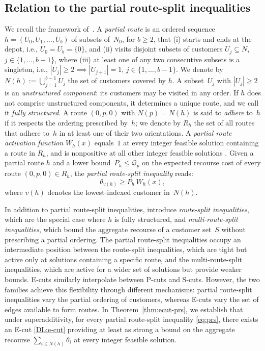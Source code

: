 \documentclass{article}
\newcommand{\rev}[1]{{\color{black}#1}}
\begin{document}
\rev{
\subsection{Relation to the partial route-split inequalities} \label{sec:ecut-prs}

We recall the framework of~\cite{hoogendoorn2023improved}. A \emph{partial route} \cite[Section~4.1]{hoogendoorn2023improved} is an ordered sequence $h = (U_0, U_1, \ldots, U_b)$ of subsets of~$N_0$, for $b \geq 2$, that (i) starts and ends at the depot, i.e., $U_0 = U_b = \{0\}$, and (ii) visits disjoint subsets of customers $U_{j} \subseteq N$, $j \in \{1,\dots,b-1\}$, where (iii) at least one of any two consecutive subsets is a singleton, i.e., $|U_j|\geq 2 \implies |U_{j+1}|=1$, $j \in \{1,\dots,b-1\}$. We denote by $N(h) := \bigcup_{j=1}^{b-1} U_j$ the set of customers covered by $h$. A subset~$U_j$ with $|U_j| \geq 2$ is an \emph{unstructured component}: its customers may be visited in any order. If $h$ does not comprise unstructured components, it determines a unique route, and we call it \emph{fully structured}. A route $(0,p,0)$ with $N(p)=N(h)$ is said to \emph{adhere} to~$h$ if it respects the ordering prescribed by~$h$; we denote by $R_h$ the set of all routes that adhere to~$h$ in at least one of their two orientations. A \emph{partial route activation function} $W_h(x)$ equals~$1$ at every integer feasible solution containing a route in $R_h$, and is nonpositive at all other integer feasible solutions \cite[Section~4.3]{hoogendoorn2023improved}. Given a partial route $h$ and a lower bound~$P_h \leq \mathcal{Q}_p$ on the expected recourse cost of every route $(0,p,0) \in R_h$, the \emph{partial route-split inequality} \cite[equation~(16)]{hoogendoorn2023improved} reads:
\begin{equation}\label{eq:prs}
  \theta_{v(h)} \geq P_h \, W_h(x),
\end{equation}
where $v(h)$ denotes the lowest-indexed customer in~$N(h)$.

In addition to partial route-split inequalities, \cite{hoogendoorn2023improved} introduce \textit{route-split inequalities}, which are the special case where $h$ is fully structured, and \textit{multi-route-split inequalities}, which bound the aggregate
recourse of a customer set~$S$ without prescribing a partial ordering. The partial route-split inequalities occupy an intermediate position between the route-split inequalities, which are tight but active only at solutions containing a specific route, and the multi-route-split inequalities, which are active for a wider set of solutions but provide weaker bounds. E-cuts similarly interpolate between P-cuts and S-cuts. However, the two families achieve this flexibility through different mechanisms: partial route-split inequalities vary the partial ordering of customers, whereas E-cuts vary the set of edges available to form routes. In Theorem~\ref{thm:ecut-prs}, we establish that under superadditivity, for every partial route-split inequality \eqref{eq:prs}, there exists an E-cut \eqref{DL:e-cut} providing at least as strong a bound on the aggregate recourse $\sum_{i \in N(h)}\theta_i$ at every integer feasible solution.

}
\end{document}
